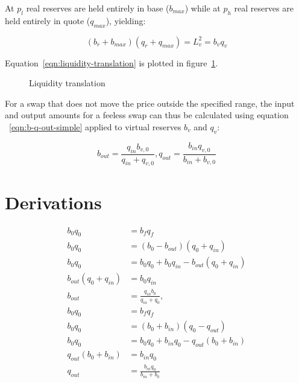 \documentclass[table, twocolumn]{article}
\begin{document}
At $p_l$ real reserves are held entirely in base ($b_{max}$) while at $p_h$ real reserves are held
entirely in quote ($q_{max}$), yielding:

\begin{equation} \label{eqn:liquidity-translation}
  (b_r + b_{max})(q_r + q_{max}) = L_v^2 = b_v q_v
\end{equation}

Equation~\ref{eqn:liquidity-translation} is plotted in figure~\ref{fig:liquidity-translation}.

\begin{figure}[!htb]
  \centering
  
  \caption{Liquidity translation}
  \label{fig:liquidity-translation}
\end{figure}

For a swap that does not move the price outside the specified range, the input and output amounts
for a feeless swap can thus be calculated using equation ~\ref{eqn:b-q-out-simple} applied to
virtual reserves $b_v$ and $q_v$:

\begin{equation}
  b_{out} = \frac{q_{in} b_{v, 0}}{q_{in} + q_{v, 0}},
  q_{out} = \frac{b_{in} q_{v, 0}}{b_{in} + b_{v, 0}}
\end{equation}

\appendix

\section{Derivations}

\begin{align} \label{eqn:b-q-out-simple-derivation}
  b_0 q_0               & = b_f q_f \nonumber                                      \\
  b_0 q_0               & = (b_0 - b_{out})(q_0 + q_{in}) \nonumber                \\
  b_0 q_0               & = b_0 q_0 + b_0 q_{in} - b_{out}(q_0 + q_{in}) \nonumber \\
  b_{out}(q_0 + q_{in}) & = b_{0} q_{in} \nonumber                                 \\
  b_{out}               & = \frac{q_{in} b_0}{q_{in} + q_0}, \nonumber             \\
  b_0 q_0               & = b_f q_f \nonumber                                      \\
  b_0 q_0               & = (b_0 + b_{in})(q_0 - q_{out}) \nonumber                \\
  b_0 q_0               & = b_0 q_0 + b_{in} q_0 - q_{out}(b_0 + b_{in}) \nonumber \\
  q_{out}(b_0 + b_{in}) & = b_{in} q_0 \nonumber                                   \\
  q_{out}               & = \frac{b_{in} q_0}{b_{in} + b_0}
\end{align}
\end{document}
